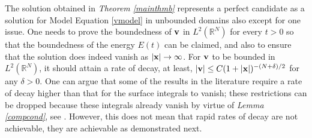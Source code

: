 \documentclass[a4 paper, 11pt,twoside]{article}
\newcommand{\V}{{\bf{v}}}
\newcommand{\X}{{\bf{x}}}
\newcommand{\0}{\Bf{0}}
\theoremstyle{definition}
\begin{document}
The solution obtained in {\it Theorem \ref{mainthmb}} represents a perfect candidate as a solution for Model Equation \eqref{vmodel} in unbounded domains also except for one issue. One needs to prove the boundedness of $\V$ in $L^2(\mathbb{R}^N)$ for every $t>0$ so that the boundedness of the energy $E(t)$ can be claimed, and also to ensure that the solution does indeed vanish as $|\X|\rightarrow\infty$. For $\V$ to be bounded in $L^2(\mathbb{R}^N)$, it should attain a rate of decay, at least, $|\V|\leq C(1+|\X|)^{-(N+\delta)/2}$ for any $\delta>0$. One can argue that some of the results in the literature require a rate of decay higher than that for the surface integrals to vanish; these restrictions can be dropped because these integrals already vanish by virtue of {\it Lemma \ref{compcond}}, see \cite[Lemma 1.5]{majda}. However, this does not mean that rapid rates of decay are not achievable, they are achievable as demonstrated next.
\end{document}
